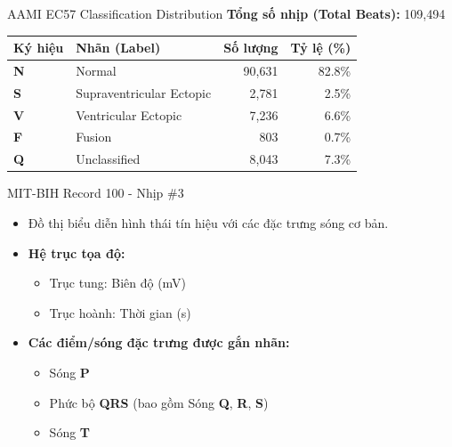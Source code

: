 \documentclass{beamer}
\begin{document}
\begin{frame}{AAMI EC57 Classification Distribution}
    \textbf{Tổng số nhịp (Total Beats):} 109,494
    \vspace{0.5cm}
    
    \begin{table}[]
        \centering
        \begin{tabular}{llrr}
        \toprule
        \textbf{Ký hiệu} & \textbf{Nhãn (Label)} & \textbf{Số lượng} & \textbf{Tỷ lệ (\%)} \\
        \midrule
        \textbf{N} & Normal & 90,631 & 82.8\% \\
        \textbf{S} & Supraventricular Ectopic & 2,781 & 2.5\% \\
        \textbf{V} & Ventricular Ectopic & 7,236 & 6.6\% \\
        \textbf{F} & Fusion & 803 & 0.7\% \\
        \textbf{Q} & Unclassified & 8,043 & 7.3\% \\
        \bottomrule
        \end{tabular}
    \end{table}
\end{frame}

\begin{frame}{MIT-BIH Record 100 - Nhịp \#3}
    \begin{itemize}
        \item Đồ thị biểu diễn hình thái tín hiệu với các đặc trưng sóng cơ bản. \vspace{0.3cm}
        \item \textbf{Hệ trục tọa độ:}
        \begin{itemize}
            \item Trục tung: Biên độ (mV)
            \item Trục hoành: Thời gian (s)
        \end{itemize} \vspace{0.3cm}
        \item \textbf{Các điểm/sóng đặc trưng được gắn nhãn:}
        \begin{itemize}
            \item Sóng \textbf{P}
            \item Phức bộ \textbf{QRS} (bao gồm Sóng \textbf{Q}, \textbf{R}, \textbf{S})
            \item Sóng \textbf{T}
        \end{itemize}
    \end{itemize}
\end{frame}
\end{document}
